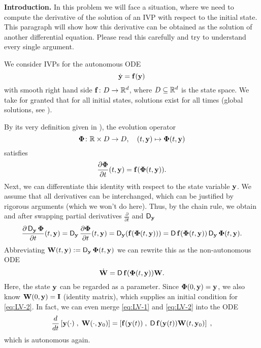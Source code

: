 \begin{problem}\label{prb:init-cond-LV} 
\textbf{Introduction.} 
In this problem we will face a situation, where we need to compute the derivative
of the solution of an IVP with respect to the initial state. This paragraph will
show how this derivative can be obtained as the solution of another differential
equation. Please read this carefully and try to understand every single argument.

We consider IVPs for the autonomous ODE
\begin{equation}\label{eq:LV-1}
\dot {{\mathbf{y}}} = {\mathbf{f}} ({\mathbf{y}})
\end{equation}
with smooth right hand side ${\mathbf{f}}\colon D\to\mathbb{R}^d$, where $D\subseteq \mathbb{R}^d$ is the
state space. We take for granted that for all initial states, solutions exist for
all times (global solutions, see ).

By its very definition given in ), the evolution operator
\[
\mathbf{\Phi}\colon \mathbb{R}\times D\to D,\quad (t,{\mathbf{y}})\mapsto \mathbf{\Phi}(t,{\mathbf{y}})
\]
satisfies
\[
\frac{\partial\mathbf{\Phi}}{\partial t}(t,{\mathbf{y}})={\mathbf{f}}(\mathbf{\Phi}(t,{\mathbf{y}})).
\]
Next, we can differentiate this identity with respect to the state variable
${\mathbf{y}}$. We assume that all derivatives can be interchanged, which can be justified
by rigorous arguments (which we won't do here). Thus, by the chain rule, we obtain
and after swapping partial derivatives $\frac{\partial}{\partial t}$ and
$\operatorname{\sf D}_{\mathbf{y}}$
\[
\frac{\partial \operatorname{\sf D}_{\mathbf{y}} \mathbf{\Phi}}{\partial t}(t,{\mathbf{y}})=\operatorname{\sf D}_{\mathbf{y}}\frac{\partial\mathbf{\Phi}}{\partial t}(t,{\mathbf{y}})=\operatorname{\sf D}_{\mathbf{y}}({\mathbf{f}}(\mathbf{\Phi}(t,{\mathbf{y}})))=\operatorname{\sf D}{\mathbf{f}}(\mathbf{\Phi}(t,{\mathbf{y}}))\operatorname{\sf D}_{\mathbf{y}}\mathbf{\Phi}(t,{\mathbf{y}}).
\]
Abbreviating ${\mathbf{W}}(t,{\mathbf{y}}):=\operatorname{\sf D}_{\mathbf{y}}\mathbf{\Phi}(t,{\mathbf{y}})$ we can rewrite this as the non-autonomous ODE
\begin{equation}\label{eq:LV-2}
\dot {{\mathbf{W}}} = \operatorname{\sf D}{\mathbf{f}}(\mathbf{\Phi}(t,{\mathbf{y}})){\mathbf{W}}.
\end{equation}
Here, the state ${\mathbf{y}}$ can be regarded as a parameter.  Since $\mathbf{\Phi}(0,{\mathbf{y}})={\mathbf{y}}$,
we also know ${\mathbf{W}}(0,{\mathbf{y}})={\mathbf{I}}$ (identity matrix), which supplies an initial
condition for \eqref{eq:LV-2}. In fact, we can even merge \eqref{eq:LV-1} and
\eqref{eq:LV-2} into the ODE
\begin{gather}
  \label{eq:LV-2a}
  \frac{d}{dt}\left[{\mathbf{y}}(\cdot)\; ,\; {\mathbf{W}}(\cdot,{\mathbf{y}}_{0})\right] = 
  \left[{\mathbf{f}}({\mathbf{y}}(t))\;,\; \operatorname{\sf D}{\mathbf{f}}({\mathbf{y}}(t)){\mathbf{W}}(t,{\mathbf{y}}_{0})\right]\;,
\end{gather}
which is autonomous again. 


\end{problem}
